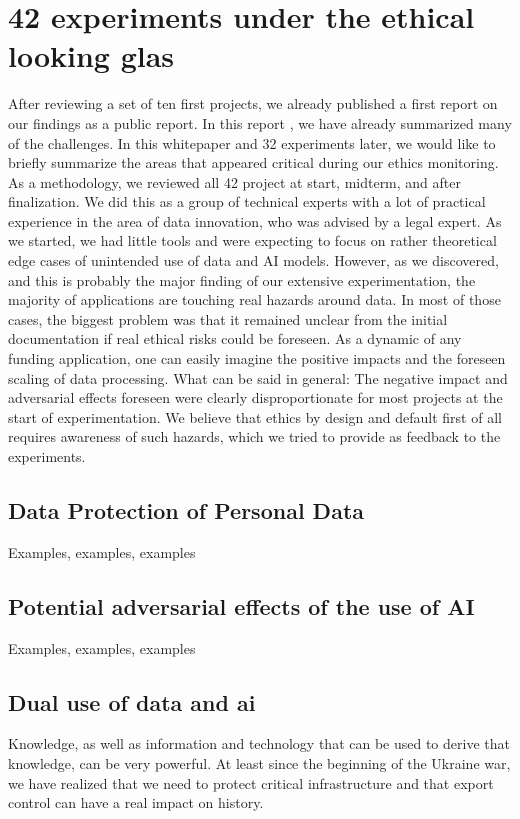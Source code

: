 \section{42 experiments under the ethical looking glas}\label{}

After reviewing a set of ten first projects, we already published a first report on our findings as a public report. In this report \cite{DXX}, we have already summarized many of the challenges. In this whitepaper and 32 experiments later, we would like to briefly summarize the areas that appeared critical during our ethics monitoring.
As a methodology, we reviewed all 42 project at start, midterm, and after finalization. We did this as a group of technical experts with a lot of practical experience in the area of data innovation, who was advised by a legal expert. As we started, we had little tools and were expecting to focus on rather theoretical edge cases of unintended use of data and AI models. However, as we discovered, and this is probably the major finding of our extensive experimentation, the majority of applications are touching real hazards around data. In most of those cases, the biggest problem was that it remained unclear from the initial documentation if real ethical risks could be foreseen. As a dynamic of any funding application, one can easily imagine the positive impacts and the foreseen scaling of data processing. What can be said in general: The negative impact and adversarial effects foreseen were clearly disproportionate for most projects at the start of experimentation. We believe that ethics by design and default first of all requires awareness of such hazards, which we tried to provide as feedback to the experiments.

\subsection{Data Protection of Personal Data}\label{}
Examples, examples, examples



\subsection{Potential adversarial effects of the use of AI}\label{}
Examples, examples, examples



\subsection{Dual use of data and ai}
Knowledge, as well as information and technology that can be used to derive that knowledge, can be very powerful. At least since the beginning of the Ukraine war, we have realized that we need to protect critical infrastructure and that export control can have a real impact on history. 






